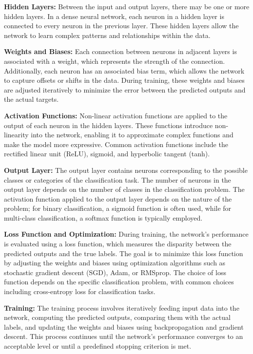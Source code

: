 \documentclass[preprint,aps,nofootinbib,a4paper,superscriptaddress,longbibliography,amsfonts,amssymb,amsmath,titlepage]{revtex4-2}
\begin{document}
\textbf{Hidden Layers:} Between the input and output layers, there may be one or more hidden layers. In a dense neural network, each neuron in a hidden layer is connected to every neuron in the previous layer. These hidden layers allow the network to learn complex patterns and relationships within the data.

\textbf{Weights and Biases:} Each connection between neurons in adjacent layers is associated with a weight, which represents the strength of the connection. Additionally, each neuron has an associated bias term, which allows the network to capture offsets or shifts in the data. During training, these weights and biases are adjusted iteratively to minimize the error between the predicted outputs and the actual targets.

\textbf{Activation Functions:} Non-linear activation functions are applied to the output of each neuron in the hidden layers. These functions introduce non-linearity into the network, enabling it to approximate complex functions and make the model more expressive. Common activation functions include the rectified linear unit (ReLU), sigmoid, and hyperbolic tangent (tanh).

\textbf{Output Layer:} The output layer contains neurons corresponding to the possible classes or categories of the classification task. The number of neurons in the output layer depends on the number of classes in the classification problem. The activation function applied to the output layer depends on the nature of the problem; for binary classification, a sigmoid function is often used, while for multi-class classification, a softmax function is typically employed.

\textbf{Loss Function and Optimization:} During training, the network's performance is evaluated using a loss function, which measures the disparity between the predicted outputs and the true labels. The goal is to minimize this loss function by adjusting the weights and biases using optimization algorithms such as stochastic gradient descent (SGD), Adam, or RMSprop. The choice of loss function depends on the specific classification problem, with common choices including cross-entropy loss for classification tasks.

\textbf{Training:} The training process involves iteratively feeding input data into the network, computing the predicted outputs, comparing them with the actual labels, and updating the weights and biases using backpropagation and gradient descent. This process continues until the network's performance converges to an acceptable level or until a predefined stopping criterion is met.
\end{document}
